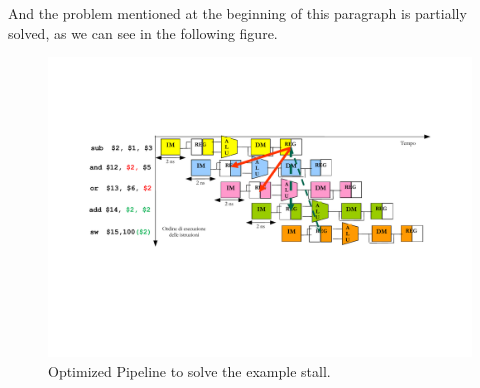 \noindent
And the problem mentioned at the beginning of this paragraph is partially solved, as we can see in the following figure.
\begin{figure}[!htp]
    \centering
    \includegraphics[width=\textwidth]{img/optimized-pipeline-2.pdf}
    \caption{Optimized Pipeline to solve the example stall.\cite{pipelining-slides}}
\end{figure}